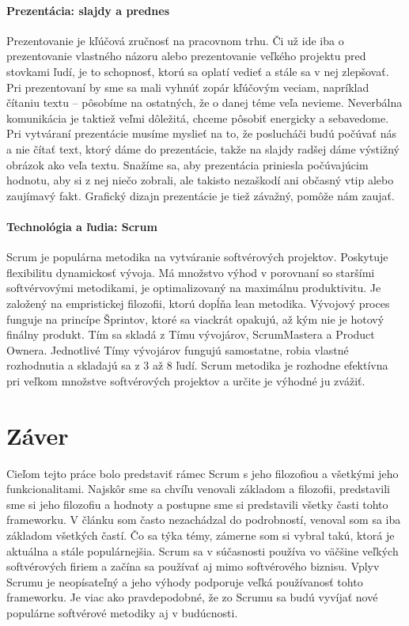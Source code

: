 \documentclass[10pt,slovak,a4paper]{article}
\begin{document}
\paragraph{Prezentácia: slajdy a prednes}

Prezentovanie je kľúčová zručnosť na pracovnom trhu. Či už ide iba o prezentovanie vlastného názoru alebo prezentovanie veľkého projektu pred stovkami ľudí, je to schopnosť, ktorú sa oplatí vedieť a stále sa v nej zlepšovať. Pri prezentovaní by sme sa mali vyhnúť zopár kľúčovým veciam, napríklad čítaniu textu – pôsobíme na ostatných, že o danej téme veľa nevieme. Neverbálna komunikácia je taktiež veľmi dôležitá, chceme pôsobiť energicky a sebavedome. Pri vytváraní prezentácie musíme myslieť na to, že poslucháči budú počúvať nás a nie čítať text, ktorý dáme do prezentácie, takže na slajdy radšej dáme výstižný obrázok ako veľa textu. Snažíme sa, aby prezentácia priniesla počúvajúcim hodnotu, aby si z nej niečo zobrali, ale takisto nezaškodí ani občasný vtip alebo zaujímavý fakt. Grafický dizajn prezentácie je tiež závažný, pomôže nám zaujať.

\paragraph{Technológia a ľudia: Scrum}

Scrum je populárna metodika na vytváranie softvérových projektov. Poskytuje flexibilitu dynamickosť vývoja. Má množstvo výhod v porovnaní so staršími softvérvovými metodikami, je optimalizovaný na maximálnu produktivitu. Je založený na empristickej filozofii, ktorú dopĺňa lean metodika. Vývojový proces funguje na princípe Šprintov, ktoré sa viackrát opakujú, až kým nie je hotový finálny produkt. Tím sa skladá z Tímu vývojárov, ScrumMastera a Product Ownera. Jednotlivé Tímy vývojárov fungujú samostatne, robia vlastné rozhodnutia a skladajú sa z 3 až 8 ľudí. Scrum metodika je rozhodne efektívna pri veľkom množstve softvérových projektov a určite je výhodné ju zvážiť. 


\section{Záver} \label{zaver}

Cieľom tejto práce bolo predstaviť rámec Scrum s jeho filozofiou a všetkými jeho funkcionalitami. Najskôr sme sa chvíľu venovali základom a filozofii, predstavili sme si jeho filozofiu a hodnoty a postupne sme si predstavili všetky časti tohto frameworku. V článku som často nezachádzal do podrobností, venoval som sa iba základom všetkých častí. Čo sa týka témy, zámerne som si vybral takú, ktorá je aktuálna a stále populárnejšia. Scrum sa v súčasnosti používa vo väčšine veľkých softvérových firiem a začína sa používať aj mimo softvérového biznisu. Vplyv Scrumu je neopísateľný a jeho výhody podporuje veľká používanosť tohto frameworku. Je viac ako pravdepodobné, že zo Scrumu sa budú vyvíjať nové populárne softvérové metodiky aj v budúcnosti.



\end{document}
